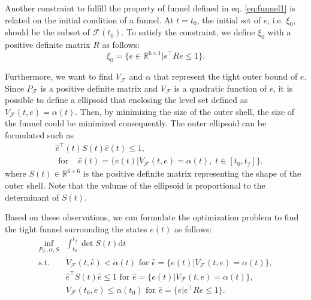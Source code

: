 \documentclass[letterpaper, 10 pt, conference]{ieeeconf}  %
\begin{document}
Another constraint to fulfill the property of funnel defined in eq. \eqref{eq:funnel1} is related on the initial condition of a funnel. 
At $t = t_0$, the initial set of $e$, i.e. $\xi_0$, should be the subset of $\mathcal{F}(t_0)$. 
To satisfy the constraint, we define $\xi_0$ with a positive definite matrix $R$ as follows:
\begin{equation}
\xi_0 = \{e \in \mathbb{R}^{6\times1}|e^\top R e \leq 1\}.
\end{equation} 

Furthermore, we want to find $V_\mathcal{F}$ and $\alpha$ that represent the tight outer bound of $e$. 
Since $P_\mathcal{F}$ is a positive definite matrix and $V_\mathcal{F}$ is a quadratic function of $e$, 
it is possible to define a ellipsoid that enclosing the level set defined as $V_\mathcal{F}(t,e) = \alpha(t)$.
Then, by minimizing the size of the outer shell, the size of the funnel could be minimized consequently.
The outer ellipsoid can be formulated such as
\begin{align}
&\hat{e}^\top(t) S(t) \hat{e}(t) \leq 1,  \nonumber \\
&\text{ for }\;\;\;\hat{e}(t) = \{e(t)|V_\mathcal{F}(t,e) = \alpha(t),\;t \in [t_0,t_f]\}. \nonumber
\end{align}
where $S(t)\in \mathbb{R}^{6\times 6}$ is the positive definite matrix representing the shape of the outer shell. Note that the volume of the ellipsoid is proportional to the determinant of $S(t)$.

Based on these observations, we can formulate the optimization problem to find the tight funnel surrounding the states $e(t)$ as follows:
\begin{equation}
\begin{array}{rl}
\displaystyle{\inf_{P_\mathcal{F},\alpha,S}} & \int_{t_0}^{t_f} \det{S(t)}\text{d}t \label{eq:optim1} \\
\displaystyle{\text{s.t.}}& \dot{V}_\mathcal{F}(t,\hat{e}) < \dot{\alpha}(t)\text{ for }\hat{e} = \{e(t)|V_\mathcal{F}(t,e) = \alpha(t)\}, \nonumber \\
& \hat{e}^\top S(t) \hat{e} \leq 1\text{ for }\hat{e} = \{e(t)|V_\mathcal{F}(t,e) = \alpha(t)\}, \nonumber \\
& V_\mathcal{F}(t_0,\hat{e}) \leq \alpha(t_0)\text{ for }\hat{e} = \{e|e^\top R e \leq 1\}. \nonumber
\end{array}
\end{equation}
\end{document}
